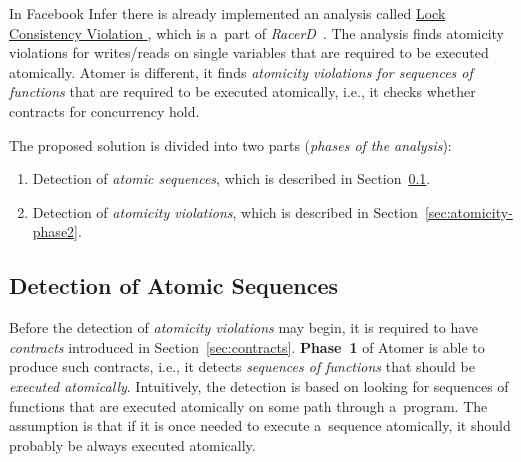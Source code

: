 \documentclass{ExcelAtFIT}
\begin{document}
In Facebook Infer there is already implemented
an analysis called 
\href{https://fbinfer.com/docs/checkers-bug-types.html\#LOCK_CONSISTENCY_VIOLATION}{
    Lock Consistency Violation
},
which is a~part of \emph{RacerD}~\cite{racerd}.
The analysis finds atomicity violations
for writes/reads on single variables that are
required to be executed atomically. Atomer is
different, it finds \emph{atomicity
violations for sequences of functions} that are
required to be executed atomically, i.e., it
checks whether contracts for concurrency hold.

The proposed solution is divided into two parts
(\emph{phases of the analysis}):
\begin{enumerate}[
    label={\textbf{Phase \arabic*}},
    leftmargin=1.5cm,
    topsep=0.4em
]
    \item
        Detection of \emph{atomic sequences},
        which is described in
        Section~\ref{sec:atomicity-phase1}.

    \item
        Detection of \emph{atomicity violations},
        which is described in
        Section~\ref{sec:atomicity-phase2}.
\end{enumerate}

\subsection{Detection of Atomic Sequences}
\label{sec:atomicity-phase1}

Before the detection of \emph{atomicity
violations} may begin, it is required to have
\emph{contracts} introduced in
Section~\ref{sec:contracts}. \textbf{Phase~1}
of Atomer is able to produce such contracts,
i.e., it detects \emph{sequences of functions}
that should be \emph{executed atomically}.
Intuitively, the detection is based on
looking for sequences of functions that are
executed atomically on some path through
a~program. The assumption is that if it is
once needed to execute a~sequence atomically,
it should probably be always executed atomically.
\end{document}
